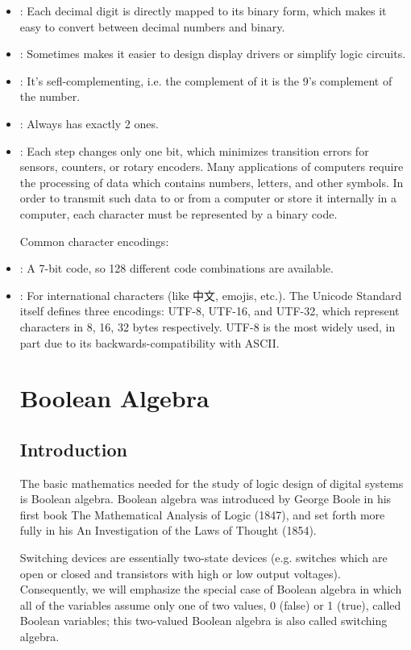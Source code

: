 \documentclass[a4paper,12pt]{report}
\begin{document}
\begin{itemize}
\item{}: Each decimal digit is directly mapped to its binary form, which makes it easy to convert between decimal numbers and binary.
\item{}: Sometimes makes it easier to design display drivers or simplify logic circuits.
\item{}: It's sefl-complementing, i.e. the complement of it is the 9’s complement of the number. 
\item{}: Always has exactly 2 ones.
\item{}: Each step changes only one bit, which minimizes transition errors for sensors, counters, or rotary encoders.
\eit
{}
Many applications of computers require the processing of data which contains numbers, letters, and other symbols. In order to transmit such data to or from a computer or store it internally in a computer, each character must be represented by a binary code.

Common character encodings:
\bit
\item{}: A 7-bit code, so 128 different code combinations are available.
\item{}: For international characters (like 中文, emojis, etc.). The Unicode Standard itself defines three encodings: UTF-8, UTF-16, and UTF-32, which represent characters in 8, 16, 32 bytes respectively. UTF-8 is the most widely used, in part due to its backwards-compatibility with ASCII.
\eit
\section{Boolean Algebra}
\subsection{Introduction}
The basic mathematics needed for the study of logic design of digital systems is Boolean algebra. Boolean algebra was introduced by George Boole in his first book The Mathematical Analysis of Logic (1847), and set forth more fully in his An Investigation of the Laws of Thought (1854).

Switching devices are essentially two-state devices (e.g. switches which are open or closed and transistors with high or low output voltages). Consequently, we will emphasize the special case of Boolean algebra in which all of the variables assume only one of two values, 0 (false) or 1 (true), called Boolean variables; this two-valued Boolean algebra is also called switching algebra.


\end{itemize}
\end{document}
